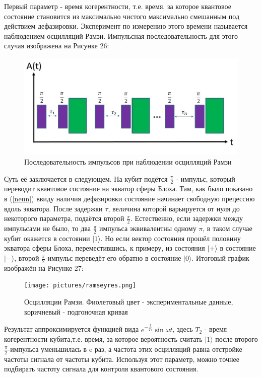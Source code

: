 Первый параметр - время когерентности, т.е. время, за которое квантовое состояние становится из максимально чистого максимально смешанным под действием дефазировки. Эксперимент по измерению этого времени называется наблюдением осцилляций Рамзи. Импульсная последовательность для этого случая изображена на Рисунке 26:

\begin{figure}[h]
	\centering
	\includegraphics[width=0.6\linewidth]{pictures/Ramseypulseseq}
	\caption{Последовательность импульсов при наблюдении осцилляций Рамзи}
	\label{fig:ramseypulseseq}
\end{figure}

 Суть её заключается в следующем. На кубит подётся $\frac{\pi}{2}$ - импульс, который переводит квантовое состояние на экватор сферы Блоха. Там, как было показано в (\ref{neun}) ввиду наличия дефазировки состояние начинает свободную прецессию вдоль экватора. После задержки $\tau$, величина которой варьируется от нуля до некоторого параметра, подаётся второй $\frac{\pi}{2}$. Естественно, если задержки между импульсами не было, то два $\frac{\pi}{2}$ импульса эквивалентны одному $\pi$, в таком случае кубит окажется в состоянии $|1\rangle$. Но если вектор состояния прошёл половину экватора сферы Блоха, переместившись, к примеру, из состояния $|+\rangle$ в состояние $|-\rangle$, второй $\frac{\pi}{2}$-импульс переведёт его обратно в состояние $|0\rangle$. Итоговый график изображён на Рисунке 27:
 
 \begin{figure}[h]
 	\centering
 	\texttt{[image: pictures/ramseyres.png]}
 	\caption{Осцилляции Рамзи. Фиолетовый цвет - экспериментальные данные, коричневый - подгоночная кривая}
 	\label{fig:ramseyres}
 \end{figure}

Результат аппроксимируется функцией вида $e^{-\frac{t}{T_2}}\sin{\omega t}$, здесь $T_2$ - время когерентности кубита,т.е. время, за которое вероятность считать $|1\rangle$ после второго $\frac{\pi}{2}$-импульса уменьшилась в e раз, а частота этих осцилляций равна отстройке частоты сигнала от частоты кубита. Используя этот параметр, можно точнее подбирать частоту сигнала для контроля квантового состояния. 

